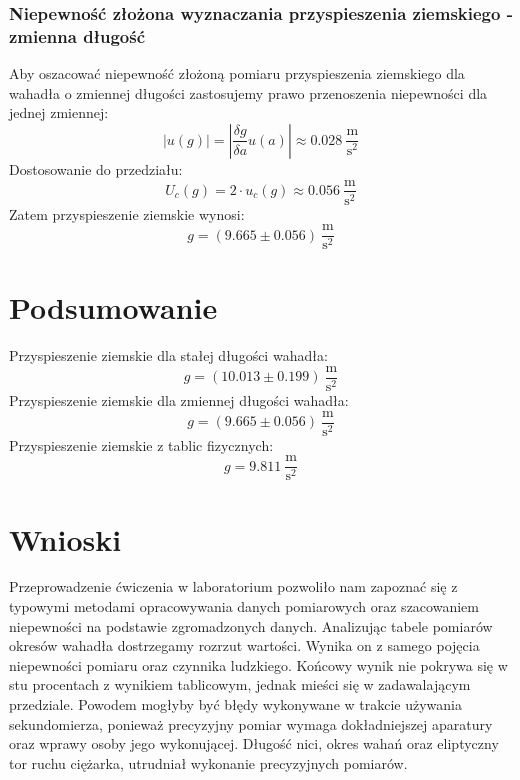 \documentclass[a4paper,12pts]{article}
\begin{document}
	\subsubsection{Niepewność złożona wyznaczania przyspieszenia ziemskiego - zmienna długość}
	Aby oszacować niepewność złożoną pomiaru przyspieszenia ziemskiego dla wahadła o zmiennej długości zastosujemy prawo przenoszenia niepewności dla jednej zmiennej:
	\begin{equation}
		|u(g)| = \left|\frac{\delta g}{\delta a} u(a)\right| \approx 0.028 ~\frac{\textrm{m}}{\textrm{s}^2}
	\end{equation}
	Dostosowanie do przedziału:
	\begin{equation}
		U_c(g) = 2 \cdot u_c(g) \approx 0.056 ~\frac{\textrm{m}}{\textrm{s}^2}
	\end{equation}
	Zatem przyspieszenie ziemskie wynosi:
	$$g = (9.665 \pm 0.056) ~\frac{\textrm{m}}{\textrm{s}^2}$$

	\section{Podsumowanie}
	Przyspieszenie ziemskie dla stałej długości wahadła:
	$$ g = (10.013 \pm 0.199) ~\frac{\textrm{m}}{\textrm{s}^2} $$
	Przyspieszenie ziemskie dla zmiennej długości wahadła:
	$$ g = (9.665 \pm 0.056) ~\frac{\textrm{m}}{\textrm{s}^2} $$
	Przyspieszenie ziemskie z tablic fizycznych:
	$$ g = 9.811 ~\frac{\textrm{m}}{\textrm{s}^2} $$


	\section{Wnioski}
	Przeprowadzenie ćwiczenia w laboratorium pozwoliło nam zapoznać się z typowymi metodami opracowywania danych pomiarowych oraz szacowaniem niepewności na podstawie zgromadzonych danych. 
	Analizując tabele pomiarów okresów wahadła dostrzegamy rozrzut wartości. Wynika on z samego pojęcia niepewności pomiaru oraz czynnika ludzkiego. Końcowy wynik nie pokrywa się w stu procentach z wynikiem tablicowym, jednak mieści się w zadawalającym przedziale. Powodem mogłyby być błędy wykonywane w trakcie używania sekundomierza, ponieważ precyzyjny pomiar wymaga dokładniejszej aparatury oraz wprawy osoby jego wykonującej. Długość nici, okres wahań oraz eliptyczny tor ruchu ciężarka, utrudniał wykonanie precyzyjnych pomiarów.
		
\end{document}
